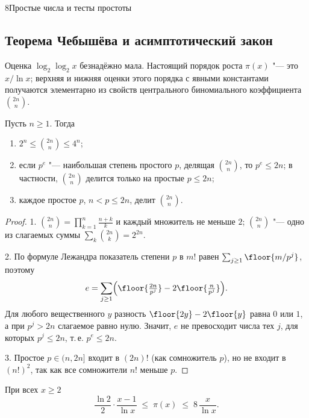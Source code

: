 \begin{lecture}{8}{Простые числа и тесты простоты}

\subsection{Теорема Чебышёва и асимптотический закон}

Оценка $\log_2 \log_2 x$ безнадёжно мала. Настоящий порядок роста $\pi(x)$ "--- это
$x / \ln x$; верхняя и нижняя оценки этого порядка с явными константами получаются элементарно
из свойств центрального биномиального коэффициента $\binom{2n}{n}$.

\begin{lemma}\label{l8:binom}
Пусть $n \ge 1$. Тогда
\begin{enumerate}
  \item $2^n \le \binom{2n}{n} \le 4^n$;
  \item если $p^{e}$ "--- наибольшая степень простого $p$, делящая $\binom{2n}{n}$, то
    $p^{e} \le 2n$; в частности, $\binom{2n}{n}$ делится только на простые $p \le 2n$;
  \item каждое простое $p$, $n < p \le 2n$, делит $\binom{2n}{n}$.
\end{enumerate}
\end{lemma}

\begin{proof}
1. $\binom{2n}{n} = \prod_{k=1}^{n} \frac{n + k}{k}$ и каждый множитель не меньше $2$;
$\binom{2n}{n}$ "--- одно из слагаемых суммы $\sum_k \binom{2n}{k} = 2^{2n}$.

2. По формуле Лежандра показатель степени $p$ в $m!$ равен $\sum_{j \ge 1} \floor{m / p^j}$,
поэтому
\[
  e = \sum_{j \ge 1} \Bigl(\floor{\tfrac{2n}{p^j}} - 2\floor{\tfrac{n}{p^j}}\Bigr).
\]
Для любого вещественного $y$ разность $\floor{2y} - 2\floor{y}$ равна $0$ или $1$, а при
$p^j > 2n$ слагаемое равно нулю. Значит, $e$ не превосходит числа тех $j$, для которых
$p^j \le 2n$, т.\,е. $p^e \le 2n$.

3. Простое $p \in (n, 2n]$ входит в $(2n)!$ (как сомножитель $p$), но не входит в $(n!)^2$,
так как все сомножители $n!$ меньше $p$.
\end{proof}

\begin{theorem}[Чебышёв, 1850]\label{l8:chebyshev}
При всех $x \ge 2$
\[
  \frac{\ln 2}{2} \cdot \frac{x - 1}{\ln x} \;\le\; \pi(x) \;\le\; 8\,\frac{x}{\ln x}.
\]
\end{theorem}


\end{lecture}
